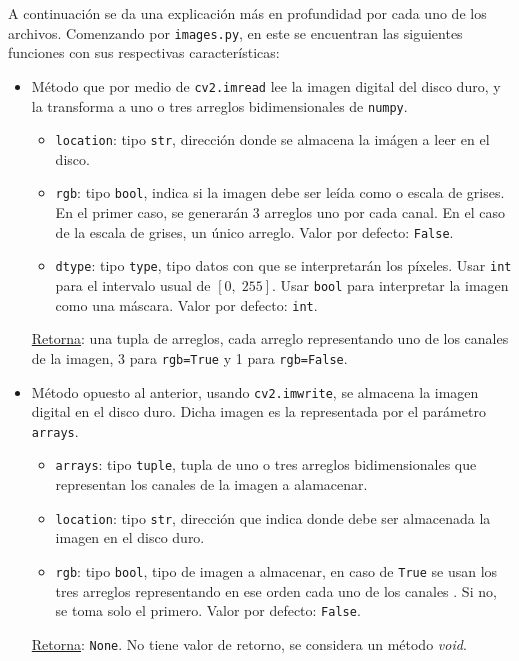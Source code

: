 A continuaci\'on se da una explicaci\'on m\'as en profundidad por cada uno de los archivos. Comenzando por \texttt{images.py}, en este se encuentran las siguientes funciones con sus respectivas características:
\begin{itemize}
	\item M\'etodo que por medio de \texttt{cv2.imread} lee la imagen digital del disco duro, y la transforma a uno o tres arreglos bidimensionales de \texttt{numpy}.
	
	\begin{itemize}
		\item \texttt{location}: tipo \texttt{str}, direcci\'on donde se almacena la im\'agen a leer en el disco.
		\item \texttt{rgb}: tipo \texttt{bool}, indica si la imagen debe ser le\'ida como \RGB o escala de grises. En el primer caso, se generar\'an 3 arreglos uno por cada canal. En el caso de la escala de grises, un \'unico arreglo. Valor por defecto: \texttt{False}.
		\item \texttt{dtype}: tipo \texttt{type}, tipo datos con que se interpretar\'an los p\'ixeles. Usar \texttt{int} para el intervalo usual de $[0,\; 255]$. Usar \texttt{bool} para interpretar la imagen como una m\'ascara. Valor por defecto: \texttt{int}.
	\end{itemize}
	\underline{Retorna}: una tupla de arreglos, cada arreglo representando uno de los canales de la imagen, 3 para \texttt{rgb=True} y 1 para \texttt{rgb=False}.
	
	\item 	M\'etodo opuesto al anterior, usando \texttt{cv2.imwrite}, se almacena la imagen digital en el disco duro. Dicha imagen es la representada por el par\'ametro \texttt{arrays}.
	
	\begin{itemize}
		\item \texttt{arrays}: tipo \texttt{tuple}, tupla de uno o tres arreglos bidimensionales que representan los canales de la imagen a alamacenar.
		\item \texttt{location}: tipo \texttt{str}, direcci\'on que indica donde debe ser almacenada la imagen en el disco duro.
		\item \texttt{rgb}: tipo \texttt{bool}, tipo de imagen a almacenar, en caso de \texttt{True} se usan los tres arreglos representando en ese orden cada uno de los canales \RGB. Si no, se toma solo el primero. Valor por defecto: \texttt{False}. 
	\end{itemize}
	\underline{Retorna}: \texttt{None}. No tiene valor de retorno, se considera un m\'etodo \textit{void}.
\end{itemize}

